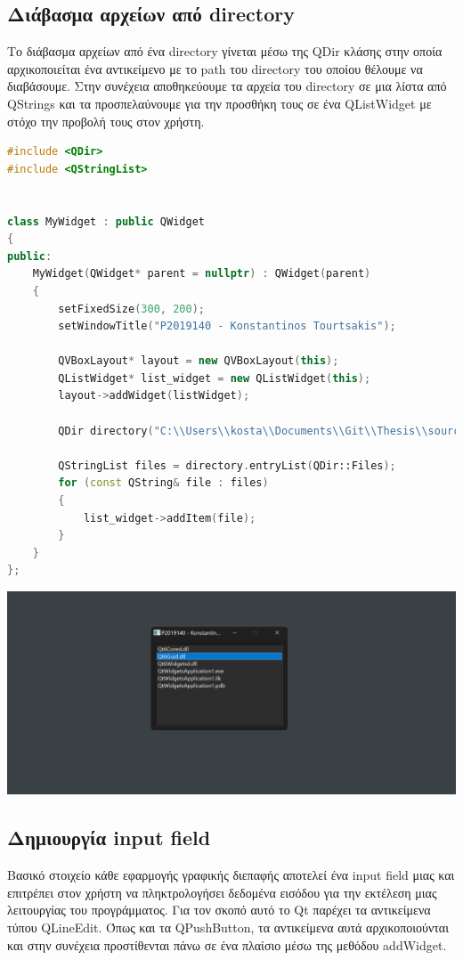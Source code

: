 \subsection{Διάβασμα αρχείων από directory}
Το διάβασμα αρχείων από ένα directory γίνεται μέσω της QDir κλάσης στην οποία
αρχικοποιείται ένα αντικείμενο με το path του directory του οποίου θέλουμε να
διαβάσουμε. Στην συνέχεια αποθηκεύουμε τα αρχεία του directory σε μια λίστα
από QStrings και τα προσπελαύνουμε για την προσθήκη τους σε ένα QListWidget
με στόχο την προβολή τους στον χρήστη.
\begin{lstlisting}[language=C++, style=cppstyle]
#include <QDir>
#include <QStringList>


class MyWidget : public QWidget 
{
public:
    MyWidget(QWidget* parent = nullptr) : QWidget(parent) 
    {
        setFixedSize(300, 200);
        setWindowTitle("P2019140 - Konstantinos Tourtsakis");

        QVBoxLayout* layout = new QVBoxLayout(this);
        QListWidget* list_widget = new QListWidget(this);
        layout->addWidget(listWidget);

        QDir directory("C:\\Users\\kosta\\Documents\\Git\\Thesis\\source\\x64\\Debug");

        QStringList files = directory.entryList(QDir::Files);
        for (const QString& file : files) 
        {
            list_widget->addItem(file);
        }
    }
};
\end{lstlisting}

\includegraphics[width=1.0\textwidth]{./images/QDir_file_reading.png}

\subsection{Δημιουργία input field}
Βασικό στοιχείο κάθε εφαρμογής γραφικής διεπαφής αποτελεί ένα input field μιας
και επιτρέπει στον χρήστη να πληκτρολογήσει δεδομένα εισόδου για την εκτέλεση
μιας λειτουργίας του προγράμματος. Για τον σκοπό αυτό το Qt παρέχει τα αντικείμενα
τύπου QLineEdit. Όπως και τα QPushButton, τα αντικείμενα αυτά αρχικοποιούνται
και στην συνέχεια προστίθενται πάνω σε ένα πλαίσιο μέσω της μεθόδου addWidget.


